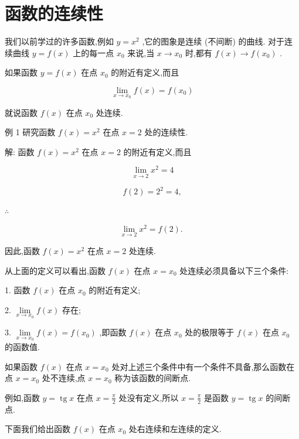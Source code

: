\documentclass[lang=cn,newtx,10pt,scheme=chinese]{elegantbook}
\begin{document}
\section{函数的连续性}
我们以前学过的许多函数,例如 \(y = {x}^{2}\) ,它的图象是连续 (不间断) 的曲线. 对于连续曲线 \(y = f\left( x\right)\) 上的每一点 \({x}_{0}\) 来说,当 \(x \rightarrow {x}_{0}\) 时,都有 \(f\left( x\right) \rightarrow f\left( {x}_{0}\right)\) .

如果函数 \(y = f\left( x\right)\) 在点 \({x}_{0}\) 的附近有定义,而且

\[
\mathop{\lim }\limits_{{x \rightarrow {x}_{0}}}f\left( x\right) = f\left( {x}_{0}\right)
\]

就说函数 \(f\left( x\right)\) 在点 \({x}_{0}\) 处连续.

例 1 研究函数 \(f\left( x\right) = {x}^{2}\) 在点 \(x = 2\) 处的连续性.

解: 函数 \(f\left( x\right) = {x}^{2}\) 在点 \(x = 2\) 的附近有定义,而且

\[
\mathop{\lim }\limits_{{x \rightarrow 2}}{x}^{2} = 4
\]

\[
f\left( 2\right) = {2}^{2} = 4,
\]

\(\therefore\)

\[
\mathop{\lim }\limits_{{x \rightarrow 2}}{x}^{2} = f\left( 2\right) \text{. }
\]

因此,函数 \(f\left( x\right) = {x}^{2}\) 在点 \(x = 2\) 处连续.

从上面的定义可以看出,函数 \(f\left( x\right)\) 在点 \(x = {x}_{0}\) 处连续必须具备以下三个条件:

1. 函数 \(f\left( x\right)\) 在点 \({x}_{0}\) 的附近有定义;

2. \(\mathop{\lim }\limits_{{x \rightarrow {x}_{0}}}f\left( x\right)\) 存在;

3. \(\mathop{\lim }\limits_{{x \rightarrow {x}_{0}}}f\left( x\right) = f\left( {x}_{0}\right)\) ,即函数 \(f\left( x\right)\) 在点 \({x}_{0}\) 处的极限等于 \(f\left( x\right)\) 在点 \({x}_{0}\) 的函数值.

如果函数 \(f\left( x\right)\) 在点 \(x = {x}_{0}\) 处对上述三个条件中有一个条件不具备,那么函数在点 \(x = {x}_{0}\) 处不连续,点 \(x = {x}_{0}\) 称为该函数的间断点.

例如,函数 \(y = \operatorname{tg}x\) 在点 \(x = \frac{\pi }{2}\) 处没有定义,所以 \(x = \frac{\pi }{2}\) 是函数 \(y = \operatorname{tg}x\) 的间断点.

下面我们给出函数 \(f\left( x\right)\) 在点 \({x}_{0}\) 处右连续和左连续的定义.
\end{document}
